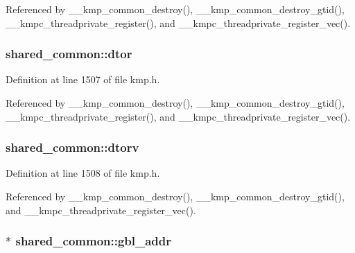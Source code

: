 Referenced by \-\_\-\-\_\-kmp\-\_\-common\-\_\-destroy(), \-\_\-\-\_\-kmp\-\_\-common\-\_\-destroy\-\_\-gtid(), \-\_\-\-\_\-kmpc\-\_\-threadprivate\-\_\-register(), and \-\_\-\-\_\-kmpc\-\_\-threadprivate\-\_\-register\-\_\-vec().

\hypertarget{structshared__common_a127171cc49794904b593bee96f1b7d04}{
\subsubsection[{dtor}]{ shared\-\_\-common\-::dtor}}\label{structshared__common_a127171cc49794904b593bee96f1b7d04}


Definition at line 1507 of file kmp.\-h.



Referenced by \-\_\-\-\_\-kmp\-\_\-common\-\_\-destroy(), \-\_\-\-\_\-kmp\-\_\-common\-\_\-destroy\-\_\-gtid(), \-\_\-\-\_\-kmpc\-\_\-threadprivate\-\_\-register(), and \-\_\-\-\_\-kmpc\-\_\-threadprivate\-\_\-register\-\_\-vec().

\hypertarget{structshared__common_a010d4cfee51a4eef6f53edb1dd7be918}{
\subsubsection[{dtorv}]{ shared\-\_\-common\-::dtorv}}\label{structshared__common_a010d4cfee51a4eef6f53edb1dd7be918}


Definition at line 1508 of file kmp.\-h.



Referenced by \-\_\-\-\_\-kmp\-\_\-common\-\_\-destroy(), \-\_\-\-\_\-kmp\-\_\-common\-\_\-destroy\-\_\-gtid(), and \-\_\-\-\_\-kmpc\-\_\-threadprivate\-\_\-register\-\_\-vec().

\hypertarget{structshared__common_abfaf275dda5ac5223f6e0f0aa333b52b}{
\subsubsection[{gbl\-\_\-addr}]{$\ast$ shared\-\_\-common\-::gbl\-\_\-addr}}\label{structshared__common_abfaf275dda5ac5223f6e0f0aa333b52b}


